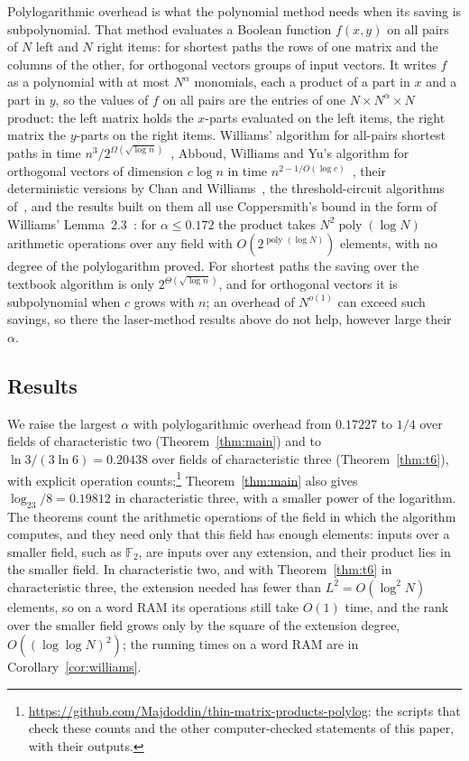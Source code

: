 \documentclass[11pt]{article}
\theoremstyle{definition}
\theoremstyle{remark}
\newcommand{\F}{\mathbb{F}}
\DeclareMathOperator{\poly}{poly}
\begin{document}
Polylogarithmic overhead is what the polynomial method needs when its saving is subpolynomial. That method evaluates a Boolean function $f(x,y)$ on all pairs of $N$ left and $N$ right items: for shortest paths the rows of one matrix and the columns of the other, for orthogonal vectors groups of input vectors. It writes $f$ as a polynomial with at most $N^\alpha$ monomials, each a product of a part in $x$ and a part in $y$, so the values of $f$ on all pairs are the entries of one $N\times N^\alpha\times N$ product: the left matrix holds the $x$-parts evaluated on the left items, the right matrix the $y$-parts on the right items. Williams' algorithm for all-pairs shortest paths in time $n^3/2^{\Omega(\sqrt{\log n})}$~\cite{Wil14a}, Abboud, Williams and Yu's algorithm for orthogonal vectors of dimension $c\log n$ in time $n^{2-1/O(\log c)}$~\cite{AWY15}, their deterministic versions by Chan and Williams~\cite{CW16}, the threshold-circuit algorithms of~\cite{Wil14b,ACW16}, and the results built on them all use Coppersmith's bound in the form of Williams' Lemma~2.3~\cite{Wil14b}: for $\alpha\le0.172$ the product takes $N^2\poly(\log N)$ arithmetic operations over any field with $O(2^{\poly(\log N)})$ elements, with no degree of the polylogarithm proved. For shortest paths the saving over the textbook algorithm is only $2^{\Theta(\sqrt{\log n})}$, and for orthogonal vectors it is subpolynomial when $c$ grows with $n$; an overhead of $N^{o(1)}$ can exceed such savings, so there the laser-method results above do not help, however large their $\alpha$.

\subsection{Results}

We raise the largest $\alpha$ with polylogarithmic overhead from $0.17227$ to $1/4$ over fields of characteristic two (Theorem~\ref{thm:main}) and to $\ln3/(3\ln6)=0.20438$ over fields of characteristic three (Theorem~\ref{thm:t6}), with explicit operation counts;\footnote{\url{https://github.com/Majdoddin/thin-matrix-products-polylog}: the scripts that check these counts and the other computer-checked statements of this paper, with their outputs.} Theorem~\ref{thm:main} also gives $\log_23/8=0.19812$ in characteristic three, with a smaller power of the logarithm. The theorems count the arithmetic operations of the field in which the algorithm computes, and they need only that this field has enough elements: inputs over a smaller field, such as $\F_2$, are inputs over any extension, and their product lies in the smaller field. In characteristic two, and with Theorem~\ref{thm:t6} in characteristic three, the extension needed has fewer than $L^2=O(\log^2N)$ elements, so on a word RAM its operations still take $O(1)$ time, and the rank over the smaller field grows only by the square of the extension degree, $O((\log\log N)^2)$; the running times on a word RAM are in Corollary~\ref{cor:williams}.
\end{document}
